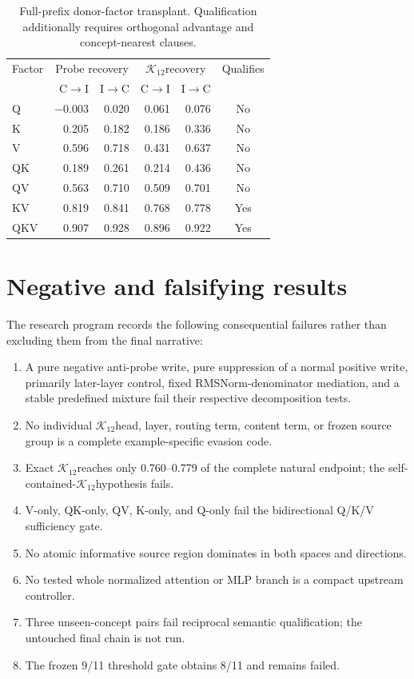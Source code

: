 \documentclass[10pt,twocolumn]{article}
\newcommand{\K}{\ensuremath{\mathcal{K}_{12}}}
\begin{document}
\begin{table}[ht]
\centering
\small
\begin{tabular}{lrrrrc}
\toprule
Factor & \multicolumn{2}{c}{Probe recovery} & \multicolumn{2}{c}{\K recovery} & Qualifies \\
 & C$\rightarrow$I & I$\rightarrow$C & C$\rightarrow$I & I$\rightarrow$C & \\
\midrule
Q & $-0.003$ & 0.020 & 0.061 & 0.076 & No \\
K & 0.205 & 0.182 & 0.186 & 0.336 & No \\
V & 0.596 & 0.718 & 0.431 & 0.637 & No \\
QK & 0.189 & 0.261 & 0.214 & 0.436 & No \\
QV & 0.563 & 0.710 & 0.509 & 0.701 & No \\
KV & 0.819 & 0.841 & 0.768 & 0.778 & Yes \\
QKV & 0.907 & 0.928 & 0.896 & 0.922 & Yes \\
\bottomrule
\end{tabular}
\caption{Full-prefix donor-factor transplant. Qualification additionally requires orthogonal advantage and concept-nearest clauses.}
\end{table}

\section{Negative and falsifying results}

The research program records the following consequential failures rather than excluding them from the final narrative:
\begin{enumerate}
  \item A pure negative anti-probe write, pure suppression of a normal positive write, primarily later-layer control, fixed RMSNorm-denominator mediation, and a stable predefined mixture fail their respective decomposition tests.
  \item No individual \K head, layer, routing term, content term, or frozen source group is a complete example-specific evasion code.
  \item Exact \K reaches only 0.760--0.779 of the complete natural endpoint; the self-contained-\K hypothesis fails.
  \item V-only, QK-only, QV, K-only, and Q-only fail the bidirectional Q/K/V sufficiency gate.
  \item No atomic informative source region dominates in both spaces and directions.
  \item No tested whole normalized attention or MLP branch is a compact upstream controller.
  \item Three unseen-concept pairs fail reciprocal semantic qualification; the untouched final chain is not run.
  \item The frozen 9/11 threshold gate obtains 8/11 and remains failed.
\end{enumerate}
\end{document}
